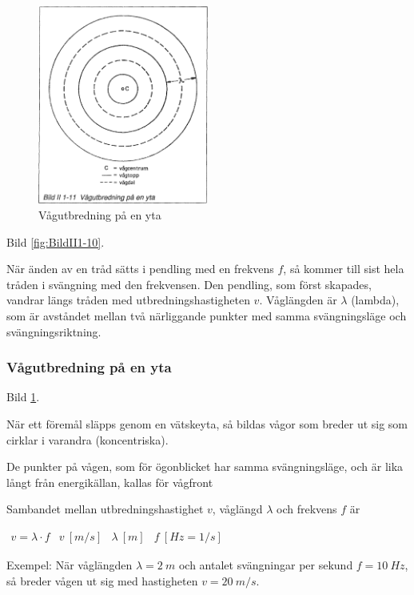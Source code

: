 \begin{figure}
  \includegraphics[width=0.5\textwidth]{images/bild_2_1-11}
  \caption{Vågutbredning på en yta}
  \label{fig:BildII1-11}
\end{figure}

Bild \ref{fig:BildII1-10}.

När änden av en tråd sätts i pendling med en frekvens \(f\), så kommer till
sist hela tråden i svängning med den frekvensen. Den pendling, som först
skapades, vandrar längs tråden med utbredningshastigheten \(v\). Våglängden är
\(\lambda\) (lambda), som är avståndet mellan två närliggande punkter med samma
svängningsläge och svängningsriktning.

\subsubsection{Vågutbredning på en yta}

Bild \ref{fig:BildII1-11}.

När ett föremål släpps genom en vätskeyta, så bildas vågor som breder ut sig
som cirklar i varandra (koncentriska).

De punkter på vågen, som för ögonblicket har samma svängningsläge, och är lika
långt från energikällan, kallas för vågfront

Sambandet mellan utbredningshastighet \(v\), våglängd \(\lambda\) och frekvens
\(f\) är

\(
\begin{array}{llll}
v = \lambda \cdot f & v \ [m/s] & \lambda \ [m] & f \ [Hz=1/s]
\end{array}
\)

Exempel: När våglängden \(\lambda = 2\ m\) och antalet svängningar per sekund
\(f = 10\ Hz\), så breder vågen ut sig med hastigheten \(v = 20\ m/s\).

